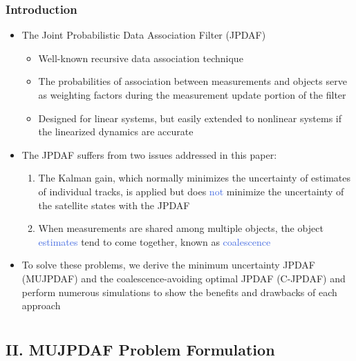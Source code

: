 \documentclass[hyperref={pdftex,pdfpagemode=none,pdfstartview=FitH},10pt]{beamer}
\def\Emph{\textcolor{RoyalBlue}}
\begin{document}
\begin{frame}
\frametitle{Introduction}


\begin{itemize}
\item The Joint Probabilistic Data Association Filter (JPDAF)
	\begin{itemize}
	\item Well-known recursive data association technique
	\item The probabilities of association between measurements and objects serve as weighting factors during the measurement update portion of the filter
	\item Designed for linear systems, but easily extended to nonlinear systems if the linearized dynamics are accurate%
	\end{itemize}
\item The JPDAF suffers from two issues addressed in this paper:
\begin{enumerate}
\item The Kalman gain, which normally minimizes the uncertainty of estimates of individual tracks, is applied but does \Emph{not} minimize the uncertainty of the satellite states with the JPDAF
\item When measurements are shared among multiple objects, the object \Emph{estimates} tend to come together, known as \Emph{coalescence}
\end{enumerate}
\item To solve these problems, we derive the minimum uncertainty JPDAF (MUJPDAF) and the coalescence-avoiding optimal JPDAF (C-JPDAF) and perform numerous simulations to show the benefits and drawbacks of each approach
\end{itemize}

\end{frame}


\section*{}
\subsection*{II. MUJPDAF Problem Formulation}
\end{document}

